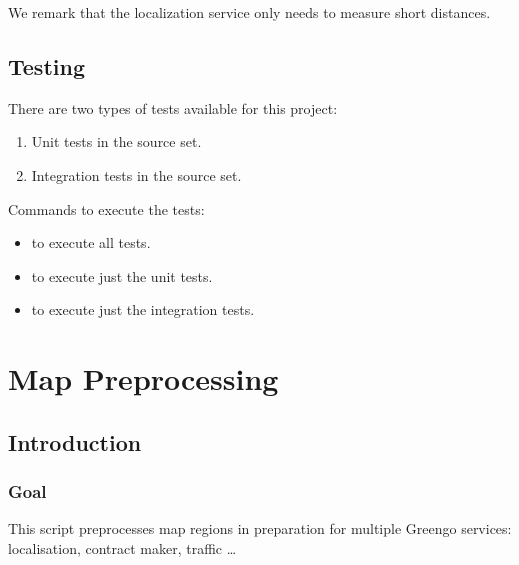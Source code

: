 \documentclass[letterpaper,10pt,english]{sphinxmanual}
\begin{document}
We remark that the localization service only needs to measure short distances.


\subsection{Testing}
\label{\detokenize{microservices/vehicle_localization/testing:testing}}\label{\detokenize{microservices/vehicle_localization/testing::doc}}
There are two types of tests available for this project:
\begin{enumerate}
\def\theenumi{\arabic{enumi}}
\def\labelenumi{\theenumi .}
\makeatletter\def\p@enumii{\p@enumi \theenumi .}\makeatother
\item {} 
Unit tests in the  source set.

\item {} 
Integration tests in the  source set.

\end{enumerate}

Commands to execute the tests:
\begin{itemize}
\item {} 
 to execute all tests.

\item {} 
 to execute just the unit tests.

\item {} 
 to execute just the integration tests.

\end{itemize}


\section{Map Preprocessing}
\label{\detokenize{microservices/map_preprocessing/index:map-preprocessing}}\label{\detokenize{microservices/map_preprocessing/index::doc}}

\subsection{Introduction}
\label{\detokenize{microservices/map_preprocessing/introduction:introduction}}\label{\detokenize{microservices/map_preprocessing/introduction::doc}}

\subsubsection{Goal}
\label{\detokenize{microservices/map_preprocessing/introduction:goal}}
This script preprocesses map regions in preparation for multiple Greengo services: localisation, contract maker, traffic …
\end{document}
